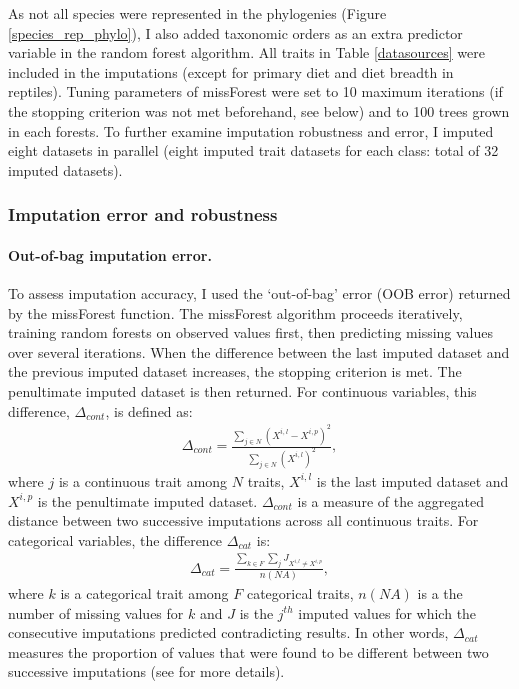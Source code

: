 As not all species were represented in the phylogenies (Figure \ref{species_rep_phylo}), I also added taxonomic orders as an extra predictor variable in the random forest algorithm. All traits in Table \ref{datasources} were included in the imputations (except for primary diet and diet breadth in reptiles). Tuning parameters of missForest were set to 10 maximum iterations (if the stopping criterion was not met beforehand, see below) and to 100 trees grown in each forests. To further examine imputation robustness and error, I imputed eight datasets in parallel (eight imputed trait datasets for each class: total of 32 imputed datasets).

\subsubsection{Imputation error and robustness}

\paragraph{Out-of-bag imputation error.}
To assess imputation accuracy, I used the `out-of-bag' error (OOB error) returned by the missForest function. The missForest algorithm proceeds iteratively, training random forests on observed values first, then predicting missing values over several iterations. When the difference between the last imputed dataset and the previous imputed dataset increases, the stopping criterion is met. The penultimate imputed dataset is then returned. For continuous variables, this difference, $\Delta_{cont}$,  is defined as:
\begin{align}
\Delta_{cont}=\frac{\sum_{j \in N}\left(X^{i,l}-X^{i,p}\right)^2}{\sum_{j \in N}\left(X^{i,l}\right)^2}, 
\end{align}
where $j$ is a continuous trait among $N$ traits, $X^{i,l}$ is the last imputed dataset and $X^{i,p}$ is the penultimate imputed dataset.  $\Delta_{cont}$ is a measure of the aggregated distance between two successive imputations across all continuous traits.  For categorical variables, the difference $\Delta_{cat}$ is:
\begin{align}
\Delta_{cat}=\frac{\sum_{k \in F}\sum_{j} J_{X^{i,l}\neq X^{i,p}}}{n(NA)}, 
\label{eqPFC}
\end{align}
where $k$ is a categorical trait among $F$ categorical traits, $n(NA)$ is a the number of missing values for $k$ and $J$ is the $j^{th}$ imputed values for which the consecutive imputations predicted contradicting results. In other words, $\Delta_{cat}$ measures the proportion of values that were found to be different between two successive imputations
(see \cite{Stekhoven2012} for more details).

